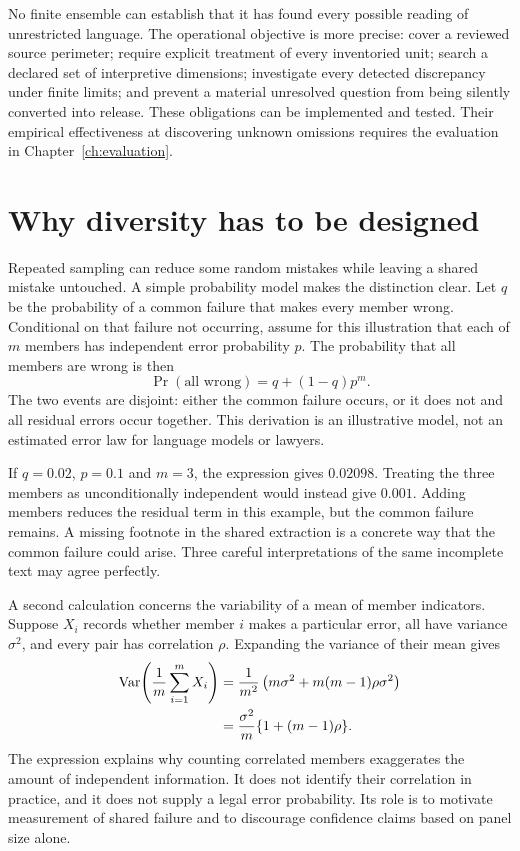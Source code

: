 No finite ensemble can establish that it has found every possible reading of
unrestricted language. The operational objective is more precise: cover a
reviewed source perimeter; require explicit treatment of every inventoried unit;
search a declared set of interpretive dimensions; investigate every detected
discrepancy under finite limits; and prevent a material unresolved question from
being silently converted into release. These obligations can be implemented and
tested. Their empirical effectiveness at discovering unknown omissions requires
the evaluation in Chapter~\ref{ch:evaluation}.

\section{Why diversity has to be designed}

Repeated sampling can reduce some random mistakes while leaving a shared mistake
untouched. A simple probability model makes the distinction clear. Let $q$ be the
probability of a common failure that makes every member wrong. Conditional on
that failure not occurring, assume for this illustration that each of $m$ members
has independent error probability $p$. The probability that all members are wrong
is then
\begin{equation}
 \Pr(\text{all wrong})=q+(1-q)p^m.
 \label{eq:common-error}
\end{equation}
The two events are disjoint: either the common failure occurs, or it does not and
all residual errors occur together. This derivation is an illustrative model,
not an estimated error law for language models or lawyers.

If $q=0.02$, $p=0.1$ and $m=3$, the expression gives $0.02098$. Treating the three
members as unconditionally independent would instead give $0.001$. Adding
members reduces the residual term in this example, but the common failure
remains. A missing footnote in the shared extraction is a concrete way that the
common failure could arise. Three careful interpretations of the same incomplete
text may agree perfectly.

A second calculation concerns the variability of a mean of member indicators.
Suppose $X_i$ records whether member $i$ makes a particular error, all have variance
$\sigma^2$, and every pair has correlation $\rho$. Expanding the variance of their
mean gives
\begin{align}
 \operatorname{Var}\!\left(\frac1m\sum_{i=1}^m X_i\right)
 &=\frac{1}{m^2}\left(m\sigma^2+m(m-1)\rho\sigma^2\right)\notag\\
 &=\frac{\sigma^2}{m}\{1+(m-1)\rho\}.
 \label{eq:ensemble-variance}
\end{align}
The expression explains why counting correlated members exaggerates the amount
of independent information. It does not identify their correlation in practice,
and it does not supply a legal error probability. Its role is to motivate
measurement of shared failure and to discourage confidence claims based on panel
size alone.

